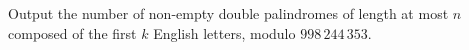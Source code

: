 Output the number of non-empty double palindromes of length at most $n$ composed of the first $k$ English letters, modulo $998\,244\,353$.